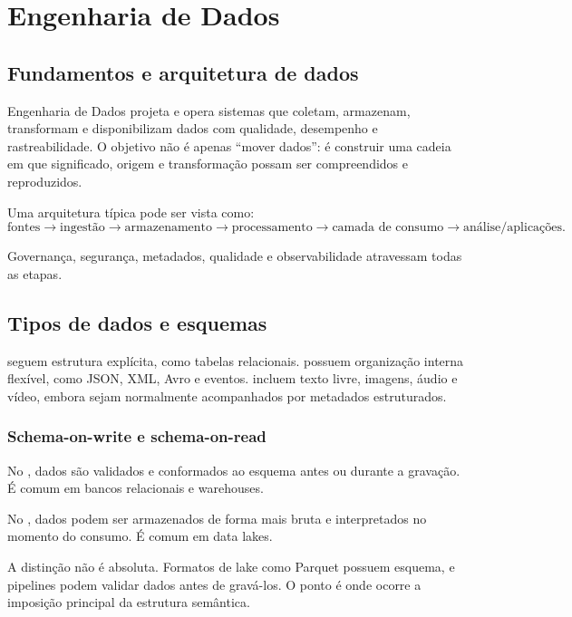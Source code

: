\chapter{Engenharia de Dados}

\section{Fundamentos e arquitetura de dados}

Engenharia de Dados projeta e opera sistemas que coletam, armazenam, transformam e disponibilizam dados com qualidade, desempenho e rastreabilidade. O objetivo não é apenas ``mover dados'': é construir uma cadeia em que significado, origem e transformação possam ser compreendidos e reproduzidos.

Uma arquitetura típica pode ser vista como:
\[
\text{fontes}\rightarrow
\text{ingestão}\rightarrow
\text{armazenamento}\rightarrow
\text{processamento}\rightarrow
\text{camada de consumo}\rightarrow
\text{análise/aplicações}.
\]

Governança, segurança, metadados, qualidade e observabilidade atravessam todas as etapas.

\section{Tipos de dados e esquemas}

 seguem estrutura explícita, como tabelas relacionais.  possuem organização interna flexível, como JSON, XML, Avro e eventos.  incluem texto livre, imagens, áudio e vídeo, embora sejam normalmente acompanhados por metadados estruturados.

\subsection{Schema-on-write e schema-on-read}

No , dados são validados e conformados ao esquema antes ou durante a gravação. É comum em bancos relacionais e warehouses.

No , dados podem ser armazenados de forma mais bruta e interpretados no momento do consumo. É comum em data lakes.

A distinção não é absoluta. Formatos de lake como Parquet possuem esquema, e pipelines podem validar dados antes de gravá-los. O ponto é onde ocorre a imposição principal da estrutura semântica.

